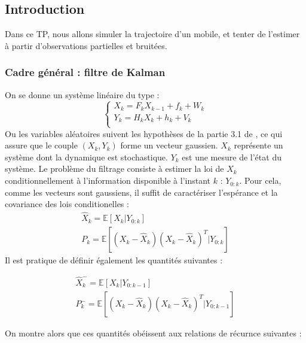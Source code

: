 \documentclass{article}
\begin{document}
\subsection{Introduction}
Dans ce TP, nous allons simuler la trajectoire d'un mobile, et tenter de l'estimer à partir d'observations partielles et bruitées.

\subsubsection{Cadre général : filtre de Kalman}
On se donne un système linéaire du type :
\begin{equation*}
   \left\{
   \begin{array}{c}
      X_{k}=F_{k}X_{k-1}+f_{k}+W_{k} \\
      Y_{k}=H_{k}X_{k}+h_{k}+V_{k} \\
   \end{array}
   \right.
\end{equation*}
Ou les variables aléatoires suivent les hypothèses de la partie 3.1 de \cite{legland2008filtrage}, ce qui assure que 
le couple $(X_k,Y_k)$ forme un vecteur gaussien.
$X_k$ représente un système dont la dynamique est stochastique. $Y_k$ est une mesure de l'état du 
système. Le problème du filtrage consiste à estimer la loi de $X_k$ conditionnellement à l'information
disponible à l'instant $k$ : $Y_{0:k}$. Pour cela, comme les vecteurs sont gaussiens, il suffit de caractériser l'espérance et la covariance des lois conditionelles : 
\begin{equation*}
   \begin{array}{c}
      \hat{X}_{k}= \mathbb{E}[X_{k}| Y_{0:k}]\\
      P_k = \mathbb{E}\left[\left(X_k-\hat{X}_k\right)\left(X_k-\hat{X}_k\right)^{T}| Y_{0:k}\right]
   \end{array}
\end{equation*}
Il est pratique de définir également les quantités suivantes : 

\begin{equation*}
   \begin{array}{c}
      \hat{X}_{k}^{-}= \mathbb{E}[X_{k}| Y_{0:k-1}]\\
      P_k^{-} = \mathbb{E}\left[\left(X_k-\hat{X}_k\right)\left(X_k-\hat{X}_k\right)^{T}| Y_{0:k-1}\right]
   \end{array}
\end{equation*}

On montre alors que ces quantités obéissent aux relations de récurnce suivantes : 
\end{document}
